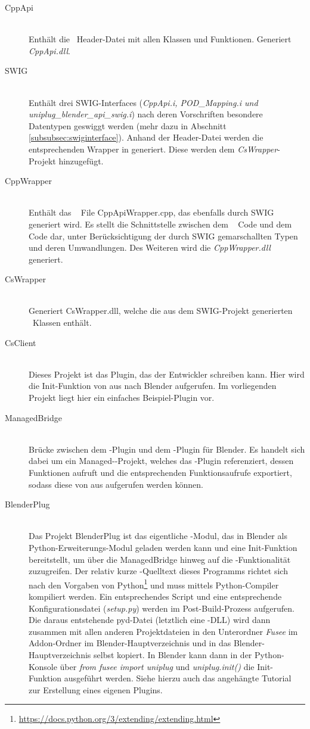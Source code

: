 \begin{description}
\item[CppApi]\hfill \\
Enthält die \CC~Header-Datei mit allen Klassen und Funktionen. Generiert \emph{CppApi.dll}.
\item[SWIG]\hfill \\
Enthält drei SWIG-Interfaces (\emph{CppApi.i, POD\_Mapping.i und \\
uniplug\_blender\_api\_swig.i}) nach deren Vorschriften besondere Datentypen geswiggt werden (mehr dazu in Abschnitt \ref{subsubsec:swiginterface}). Anhand der Header-Datei werden die entsprechenden Wrapper in \CS generiert. Diese werden dem \emph{CsWrapper}-Projekt hinzugefügt.
\item[CppWrapper]\hfill \\
Enthält das \CC~ File CppApiWrapper.cpp, das ebenfalls durch SWIG generiert wird. Es stellt die Schnittstelle zwischen dem \CC~ Code und dem \CS~ Code dar, unter Berücksichtigung der durch SWIG gemarschallten Typen und deren Umwandlungen. Des Weiteren wird die \emph{CppWrapper.dll} generiert.
\item[CsWrapper]\hfill \\
Generiert CsWrapper.dll, welche die aus dem SWIG-Projekt generierten \CS~Klassen enthält. 
\item[CsClient]\hfill \\
Dieses Projekt ist das Plugin, das der Entwickler schreiben kann. Hier wird die Init-Funktion von \CS aus nach Blender aufgerufen. Im vorliegenden Projekt liegt hier ein einfaches Beispiel-Plugin vor.
\item[ManagedBridge]\hfill \\ 
Brücke zwischen dem \CS-Plugin und dem \CC-Plugin für Blender. Es handelt sich dabei um ein Managed-\CC-Projekt, welches das \CS-Plugin referenziert, dessen Funktionen aufruft und die entsprechenden Funktionsaufrufe exportiert, sodass diese von \CC aus aufgerufen werden können.
\item[BlenderPlug]\hfill \\ 
Das Projekt BlenderPlug ist das eigentliche \CC-Modul, das in Blender als Python-Erweiterungs-Modul geladen werden kann und eine Init-Funktion bereitstellt, um über die ManagedBridge hinweg auf die \CS{}-Funktionalität zuzugreifen. Der relativ kurze \CC-Quelltext dieses Programms richtet sich nach den Vorgaben von Python\footnote{\url{https://docs.python.org/3/extending/extending.html}} und muss mittels Python-Compiler kompiliert werden. Ein entsprechendes Script und eine entsprechende Konfigurationsdatei (\emph{setup.py}) werden im Post-Build-Prozess aufgerufen. Die daraus entstehende pyd-Datei (letztlich eine \CC-DLL) wird dann zusammen mit allen anderen Projektdateien in den Unterordner \emph{Fusee} im Addon-Ordner im Blender-Hauptverzeichnis und in das Blender-Hauptverzeichnis selbst kopiert. In Blender kann dann in der Python-Konsole über \emph{from fusee import uniplug} und \emph{uniplug.init()} die Init-Funktion ausgeführt werden. Siehe hierzu auch das angehängte Tutorial zur Erstellung eines eigenen Plugins.
\end{description}

